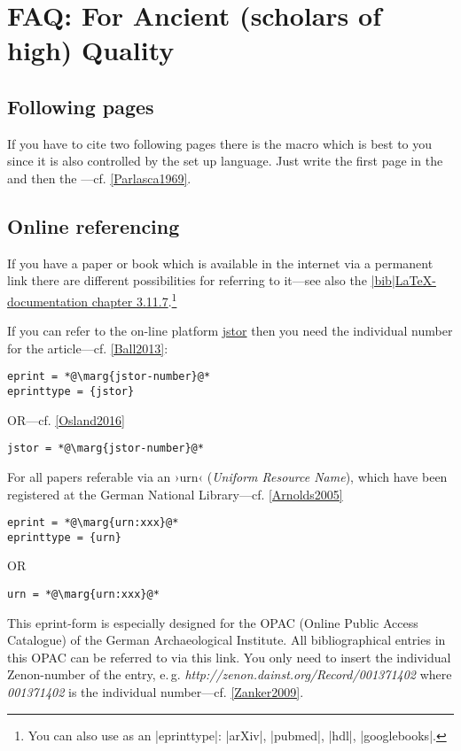 \documentclass[a4paper,
10pt,
greek,
french,
spanish,
italian,
ngerman,
english
]{ltxdoc}
\begin{document}
\section{FAQ: For  Ancient (scholars of high) Quality}
\subsection{Following pages}
\DescribeMacro{\psq} If you have to cite two following pages there is the macro  which is best to you since it is also controlled by the set up language.
Just write the first page in the  and then the ---cf. \cref{Parlasca1969}.

\subsection{Online referencing}
 If you have a paper or book which is available 
in the internet via a permanent link there are different possibilities for referring to it---see also the
 \href{http://tug.ctan.org/macros/latex/exptl/biblatex/doc/biblatex.pdf}{|bib|\LaTeX-documentation chapter 3.11.7}.\footnote{You can also use as an |eprinttype|: |arXiv|, |pubmed|, |hdl|, |googlebooks|.
}

 If you can refer to the on-line platform \href{www.jstor.org}{jstor} then you need the individual number for the article---cf. \cref{Ball2013}:
\begin{lstlisting}
eprint = *@\marg{jstor-number}@*
eprinttype = {jstor} 
\end{lstlisting}			
OR---cf. \cref{Osland2016}
\begin{lstlisting}
jstor = *@\marg{jstor-number}@*
\end{lstlisting}	

For all papers referable via an ›urn‹ (\emph{Uniform Resource Name}), which have been registered at the German National Library---cf. \cref{Arnolds2005}
\begin{lstlisting}
eprint = *@\marg{urn:xxx}@*
eprinttype = {urn} 
\end{lstlisting}			

OR
\begin{lstlisting}
urn = *@\marg{urn:xxx}@*
\end{lstlisting}	

This eprint-form is especially designed for the OPAC (Online Public Access Catalogue) of the German Archaeological Institute.
All bibliographical entries in this OPAC can be referred to via this link.
You only need to insert the individual Zenon-number of the entry, e.\,g. \emph{http://zenon.dainst.org/Record/001371402} where \emph{001371402} is the individual number---cf. \cref{Zanker2009}.
\end{document}
